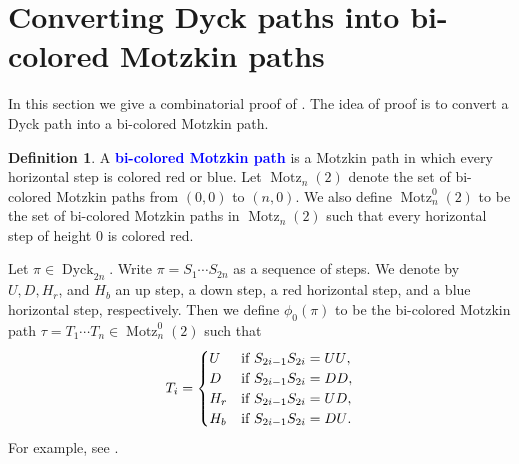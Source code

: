 \documentclass[oneside]{book}
\numberwithin{equation}{section}
\theoremstyle{definition}
\newtheorem{defn}[thm]{Definition}
\newcommand\Motz{\operatorname{Motz}}
\newcommand{\Dyck}{\operatorname{Dyck}}
\renewcommand\emph[1]{\textcolor{blue}{\bf #1}}
\begin{document}
\section{Converting Dyck paths into bi-colored Motzkin paths}

In this section we give a combinatorial proof of . The
idea of proof is to convert a Dyck path into a bi-colored Motzkin
path.

\begin{defn}\label{def:9}
  A \emph{bi-colored Motzkin path} is a Motzkin path in which every
  horizontal step is colored red or blue. Let \( \Motz_n(2) \) denote
  the set of bi-colored Motzkin paths from \( (0,0) \) to \( (n,0) \).
  We also define \( \Motz^0_n(2) \) to be the set of bi-colored
  Motzkin paths in \( \Motz_n(2) \) such that every horizontal step of
  height \( 0 \) is colored red.
\end{defn}

Let \( \pi\in \Dyck_{2n} \). Write \( \pi = S_1 \cdots S_{2n} \) as a
sequence of steps. We denote by \( U,D,H_r \), and \( H_b \) an up
step, a down step, a red horizontal step, and a blue horizontal step,
respectively. Then we define \( \phi_0(\pi) \) to be the bi-colored
Motzkin path \( \tau = T_1 \cdots T_n \in \Motz^0_n(2) \) such that
\[
  T_i =
  \begin{cases}
   U & \mbox{if \( S_{2i-1}S_{2i} = UU \)},\\
   D & \mbox{if \( S_{2i-1}S_{2i} = DD \)},\\
   H_r & \mbox{if \( S_{2i-1}S_{2i} = UD \)},\\
   H_b & \mbox{if \( S_{2i-1}S_{2i} = DU \)}.
  \end{cases}
\]
For example, see .
\end{document}
